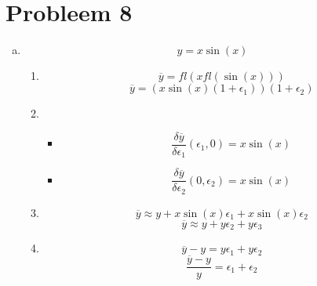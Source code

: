 \documentclass[12pt,a4paper]{article}
\begin{document}
\section{Probleem 8}
\begin{enumerate}[(a)]
\item
\[
y=x\sin(x)
\]
\begin{enumerate}[1.]
\item
\[
\overline{y} = fl(xfl(\sin(x)))
\]
\[
\overline{y} = (x\sin(x)(1+\epsilon_1))(1+\epsilon_2)
\]
\item
\begin{itemize}
\item
\[
\frac{\delta\overline{y}}{\delta\epsilon_1}(\epsilon_1,0) = x\sin(x)
\]
\item
\[
\frac{\delta\overline{y}}{\delta\epsilon_2}(0,\epsilon_2) = x\sin(x)
\]
\end{itemize}
\item
\[
\overline{y} \approx y + x\sin(x)\epsilon_1 + x\sin(x)\epsilon_2
\]
\[
\overline{y} \approx y + y\epsilon_2 + y\epsilon_3
\]
\item
\[
\overline{y} - y = y\epsilon_1 + y\epsilon_2
\]
\[
\frac{\overline{y}-y}{y} = \epsilon_1 + \epsilon_2
\]
\end{enumerate}



\end{enumerate}
\end{document}
